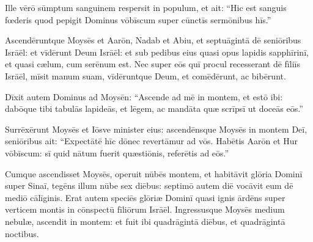 Ille vērō sūmptum sanguinem
respersit in populum, et ait: ``Hic est sanguis fœderis quod
pepigit Dominus vōbīscum super cūnctīs sermōnibus hīs.''

Ascendēruntque Moysēs et Aarōn, Nadab et Abiu, et septuāgintā dē seniōribus
Isrāēl: 
et vīdērunt Deum Isrāēl: et sub pedibus eius quasi opus
lapidis sapphīrinī, et quasi cælum, cum serēnum est. 
Nec
super eōs quī procul recesserant dē fīliīs Isrāēl, mīsit manum suam,
vīdēruntque Deum, et comēdērunt, ac
bibērunt. 

Dīxit autem Dominus ad Moysēn: ``Ascende ad mē
in montem, et estō ibi: dabōque tibi tabulās lapideās, et lēgem, ac mandāta quæ scrīpsī ut doceās eōs.''

Surrēxērunt Moysēs et Iōsve minister eius: ascendēnsque Moysēs in montem
Deī, 
seniōribus ait: ``Expectātē hīc dōnec revertāmur ad
vōs. Habētis Aarōn et Hur vōbīscum: sī quid nātum fuerit
quæstiōnis, referētis ad eōs.''

Cumque ascendisset Moysēs,
operuit nūbēs montem, 
et habitāvit glōria Dominī super Sinaī, tegēns
illum nūbe sex diēbus: septimō autem diē vocāvit eum dē mediō
cālīginis. 
Erat autem speciēs glōriæ Dominī quasi ignis
ārdēns super verticem montis in cōnspectū fīliōrum Isrāēl. 
Ingressusque Moysēs medium nebulæ,
ascendit in montem: et fuit ibi quadrāgintā diēbus, et quadrāgintā
noctibus.
